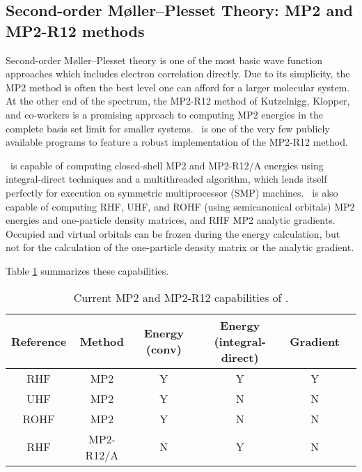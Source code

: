 \subsection{Second-order M{\o}ller--Plesset Theory: MP2 and MP2-R12 methods} \label{mp2}

Second-order M{\o}ller--Plesset theory is one of the most basic wave
function approaches which includes electron correlation
directly.
Due to its simplicity, the MP2 method is often the best
level one can afford for a larger molecular system.
At the other end of the spectrum, the MP2-R12 method
of Kutzelnigg, Klopper, and co-workers is a promising
approach to computing MP2 energies in the complete
basis set limit for smaller systems. \PSIthree\ is
one of the very few publicly available programs to
feature a robust implementation of the MP2-R12 method.

\PSIthree\ is capable of computing closed-shell
MP2 and MP2-R12/A energies using integral-direct techniques and a
multithreaded algorithm, which lends itself perfectly for execution 
on symmetric multiprocessor (SMP) machines. \PSIthree\ is also
capable of computing RHF, UHF, and ROHF (using semicanonical orbitals)
MP2 energies and one-particle density matrices, and RHF MP2 analytic 
gradients.  Occupied and virtual orbitals can be frozen during the 
energy calculation, but not for the calculation of the 
one-particle density matrix or the analytic gradient.

Table \ref{table:mp2summary} summarizes these capabilities.
\begin{table}[h]
\begin{center}
\begin{tabular}{cccccc}
\hline
\hline
Reference & Method    & Energy (conv) & Energy (integral-direct) & Gradient  \\
\hline
RHF       & MP2       & Y             & Y                        & Y \\
UHF       & MP2       & Y             & N                        & N \\
ROHF      & MP2       & Y             & N                        & N \\
RHF       & MP2-R12/A & N             & Y                        & N \\
\hline
\hline
\end{tabular}
\end{center}
\caption{Current MP2 and MP2-R12 capabilities of \PSIthree.}
\label{table:mp2summary}
\end{table}

